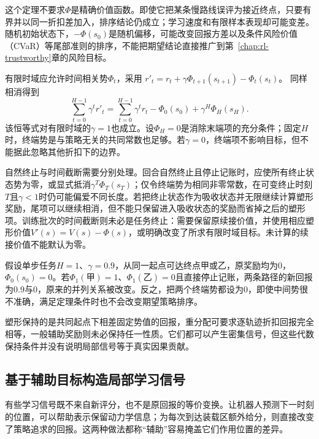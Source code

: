 这个定理不要求$\Phi$是精确价值函数。即使它把某条慢路线误评为接近终点，只要有界并以同一折扣差加入，排序结论仍成立；学习速度和有限样本表现却可能变差。随机初始状态下，$-\Phi(s_0)$是随机偏移，可能改变回报方差以及条件风险价值（CVaR）等尾部准则的排序，不能把期望结论直接推广到第~\ref{chap:rl-trustworthy}章的风险目标。

有限时域应允许时间相关势$\Phi_t$，采用
$r'_t=r_t+\gamma\Phi_{t+1}(s_{t+1})-\Phi_t(s_t)$。
同样相消得到
\begin{equation}
  \sum_{t=0}^{H-1}\gamma^t r'_t
  =\sum_{t=0}^{H-1}\gamma^t r_t
      -\Phi_0(s_0)+\gamma^H\Phi_H(s_H).
  \label{eq:rl-reward-shaping-terminal}
\end{equation}
该恒等式对有限时域的$\gamma=1$也成立。设$\Phi_H=0$是消除末端项的充分条件；固定$H$时，终端势是与策略无关的共同常数也足够。若$\gamma=0$，终端项不影响目标，但不能据此忽略其他折扣下的边界。

自然终止与时间截断需要分别处理。回合自然终止且停止记账时，应使所有终止状态势为零，或显式抵消$\gamma^T\Phi_T(s_T)$；仅令终端势为相同非零常数，在可变终止时刻$T$且$\gamma<1$时仍可能偏爱不同长度。若把终止状态作为吸收状态并无限继续计算塑形奖励，尾项可以继续相消，但不能只保留进入吸收状态的奖励而省掉之后的塑形项。训练批次的时间截断则未必是任务终止：需要保留原续接价值，并使用相应塑形价值$V'(s)=V(s)-\Phi(s)$，或明确改变了所求有限时域目标。未计算的续接价值不能默认为零。

\begin{example}[遗漏终端势会改变排序]
  \label{ex:rl-reward-terminal}
  假设单步任务$H=1$、$\gamma=0.9$，从同一起点可达终点甲或乙，原奖励均为0，$\Phi_0(s_0)=0$。若$\Phi_1(\text{甲})=1$、$\Phi_1(\text{乙})=0$且直接停止记账，两条路径的新回报为$0.9$与0，原来的并列关系被改变。反之，把两个终端势都设为0，即使中间势很不准确，满足定理条件时也不会改变期望策略排序。
\end{example}

塑形保持的是共同起点下相差固定势值的回报，重分配可要求逐轨迹折扣回报完全相等，一般辅助奖励则未必保持任一性质。它们都可以产生密集信号，但这些代数保持条件并没有说明局部信号等于真实因果贡献。

\subsection{基于辅助目标构造局部学习信号}
\label{sec:rl-reward-auxiliary}

有些学习信号既不来自新评分，也不是原回报的等价变换。让机器人预测下一时刻的位置，可以帮助表示保留动力学信息；为每次到达装载区额外给分，则直接改变了策略追求的回报。这两种做法都称“辅助”容易掩盖它们作用位置的差异。

